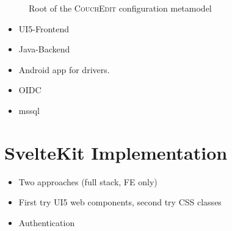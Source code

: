 \begin{figure}[ht]
    \centering
    
    \caption{Root of the \textsc{CouchEdit} configuration metamodel}
    \label{fig:metamodel-base}
\end{figure}

\begin{itemize}
    \item UI5-Frontend
    \item Java-Backend
    \item Android app for drivers.
    \item OIDC
    \item mssql
\end{itemize}


\section{SvelteKit Implementation}

\begin{itemize}
    \item Two approaches (full stack, FE only)
    \item First try UI5 web components, second try CSS classes
    \item Authentication
\end{itemize}